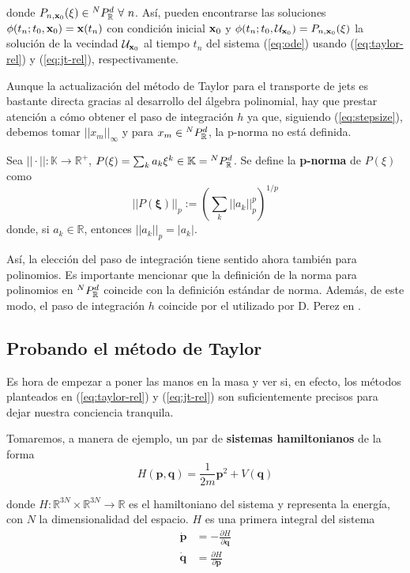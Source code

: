 donde $P_{n,\xo}(\xi) \in \pkk{N}{d} \ \forall \ n$. Así, pueden encontrarse las soluciones $\phi(t_n;t_0,\mathbf{x}_0) = \mathbf{x}(t_n)$ con condición inicial $\mathbf{x}_0$ y $\phi(t_n;t_0,\mathcal{U}_{\mathbf{x}_0}) = P_{n,\mathbf{x}_0}(\xi)$ la solución de la vecindad $\mathcal{U}_{\mathbf{x}_0}$ al tiempo
$t_n$ del sistema (\ref{eq:ode}) usando (\ref{eq:taylor-rel}) y (\ref{eq:jt-rel}), respectivamente.

Aunque la actualización del método de Taylor para el transporte de jets es bastante directa gracias al desarrollo del álgebra polinomial, hay que prestar atención a cómo obtener el paso de integración $h$ ya que, siguiendo (\ref{eq:stepsize}), debemos tomar $||x_m||_\infty$ y para $x_m \in {^{N}P_{\mathbb{R}}^ d }$, la p-norma no está definida.

\begin{definicion}
Sea $||\cdot|| : \mathbb{K} \to \mathbb{R}^+$, $P(\mathbf{\xi}) = \sum_{k} a_k \mathbf{\xi}^k \in \mathbb{K} = {^{N}P_{\mathbb{R}}^ d }$. Se define la \textbf{p-norma} de $P(\xi)$ como
\begin{equation}
 ||P(\mathbf{\xi})||_p := \left( \sum_{k} ||a_k||_p^p \right)^{1/p}
 \label{eq:poly-norm}
\end{equation}  
donde, si $a_k \in \mathbb{R}$, entonces $||a_k||_p = |a_k|$.
\end{definicion}

Así, la elección del paso de integración tiene sentido ahora también para polinomios. Es importante mencionar que la definición de la norma para polinomios en ${^{N}P_{\mathbb{R}}^ d }$ coincide con la definición estándar de norma. Además, de este modo, el paso de integración $h$ coincide por el utilizado por D. Perez en \cite{P-palau}.

\subsection{Probando el método de Taylor}
\label{sec:benchmark-taylor}

Es hora de empezar a poner las manos en la masa y ver si, en efecto, los métodos planteados en (\ref{eq:taylor-rel}) y (\ref{eq:jt-rel}) son suficientemente precisos para dejar nuestra conciencia tranquila. 

Tomaremos, a manera de ejemplo, un par de \textbf{sistemas hamiltonianos} de la forma
\begin{equation}
 H(\mathbf{p},\mathbf{q}) = \frac{1}{2m}\mathbf{p}^2 + V(\mathbf{q})
 \label{eq:hamiltonian}
\end{equation}

donde $H: \mathbb{R}^{3N}\times\mathbb{R}^{3N} \to \mathbb{R}$ es el hamiltoniano del sistema y representa la energía, con $N$ la dimensionalidad del espacio. $H$ es una primera integral del sistema
\begin{align}
 \dot{\mathbf{p}} &= -\frac{\partial{H}}{\partial{\mathbf{q}}} \nonumber \\
 \dot{\mathbf{q}} &= \frac{\partial{H}}{\partial{\mathbf{p}}}
\label{eq:ham-rel}
\end{align}

